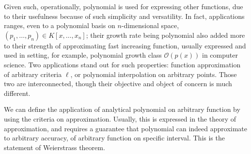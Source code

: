 \documentclass[10pt]{article} %
\begin{document}
Given such, operationally, polynomial is used for expressing other functions, due to their usefulness because of such simplicity and versatility. In fact, applications ranges, even to a polynomial basis on $n$-dimensional space, $(p_{1},\dots,p_{n})\in K[x,\dots,x_{n}]$; their growth rate being polynomial also added more to their strength of approximating fast increasing function, usually expressed and used in setting, for example, polynomial growth class $\mathcal{O}(p(x))$ in computer science. Two applications stand out for such properties: function approximation of arbitrary criteria $\ell$, or polynomial interpolation on arbitrary points. Those two are interconnected, though their objective and object of concern is much different. 

We can define the application of analytical polynomial on arbitrary function by using the criteria on approximation. Usually, this is expressed in the theory of approximation, and requires a guarantee that polynomial can indeed approximate to arbitrary accuracy, of arbitrary function on specific interval. This is the statement of Weierstrass theorem. 
\end{document}
